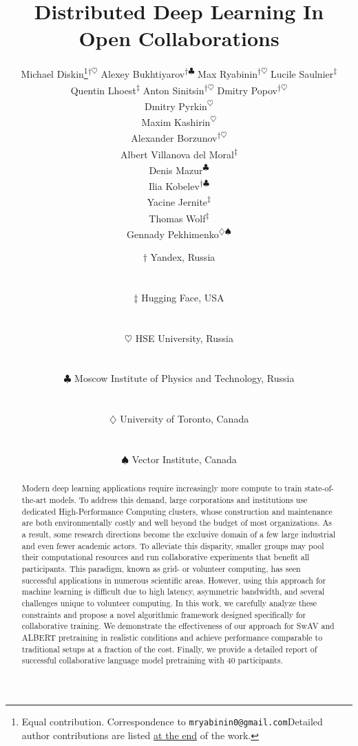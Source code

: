 \documentclass{article}
\title{Distributed Deep Learning In Open Collaborations}
\author{%
  Michael Diskin\thanks{Equal contribution. Correspondence to \texttt{mryabinin0@gmail.com}\newline Detailed author contributions are listed \hyperref[sec:contributions]{at the end} of the work.}\textsuperscript{\hspace{0.6em}$\dag\heartsuit$}
   \And
   Alexey Bukhtiyarov\footnotemark[1]\textsuperscript{\hspace{0.6em}$\dag\clubsuit$}
   \And
   Max Ryabinin\footnotemark[1]\textsuperscript{\hspace{0.6em}$\dag\heartsuit$}
   \AND
   Lucile Saulnier\textsuperscript{$\ddag$}
   \And
   Quentin Lhoest\textsuperscript{$\ddag$}
   \And
   Anton Sinitsin\textsuperscript{$\dag\heartsuit$}
   \And
   Dmitry Popov\textsuperscript{$\dag\heartsuit$}\\
   \And
   Dmitry Pyrkin\textsuperscript{$\heartsuit$}\\
   \And 
   Maxim Kashirin\textsuperscript{$\heartsuit$}\\
   \And
   Alexander Borzunov\textsuperscript{$\dag\heartsuit$}\\
   \And
   Albert Villanova del Moral\textsuperscript{$\ddag$}\\
   \And
   Denis Mazur\textsuperscript{$\clubsuit$}\\
   \And
   Ilia Kobelev\textsuperscript{$\dag\clubsuit$}\\
   \And
   Yacine Jernite\textsuperscript{$\ddag$}\\
   \And
   Thomas Wolf\textsuperscript{$\ddag$}\\
   \And
   Gennady Pekhimenko\textsuperscript{$\diamondsuit\spadesuit$}\\
   \and
   \centerline{$\dag$ Yandex, Russia}\\
   \centerline{$\ddag$ Hugging Face, USA}\\
   \centerline{$\heartsuit$ HSE University, Russia}\\
   \centerline{$\clubsuit$ Moscow Institute of Physics and Technology, Russia}\\
   \centerline{$\diamondsuit$  University of Toronto, Canada}\\
   \centerline{$\spadesuit$ Vector Institute, Canada}
\vspace{-16pt}
}
\begin{document}
\maketitle

\begin{abstract}
Modern deep learning applications require increasingly more compute to train state-of-the-art models. To address this demand, large corporations and institutions use dedicated High-Performance Computing clusters, whose construction and maintenance are both environmentally costly and well beyond the budget of most organizations. As a result, some research directions become the exclusive domain of a few large industrial and even fewer academic actors. To alleviate this disparity, smaller groups may pool their computational resources and run collaborative experiments that benefit all participants. This paradigm, known as grid- or volunteer computing, has seen successful applications in numerous scientific areas. However, using this approach for machine learning is difficult due to high latency, asymmetric bandwidth, and several challenges unique to volunteer computing. In this work, we carefully analyze these constraints and propose a novel algorithmic framework designed specifically for collaborative training. We demonstrate the effectiveness of our approach for SwAV and ALBERT pretraining in realistic conditions and achieve performance comparable to traditional setups at a fraction of the cost. Finally, we provide a detailed report of successful collaborative language model pretraining with 40 participants.
\vspace{-8pt}


\end{abstract}















\clearpage

\clearpage

\appendix

\end{document}
